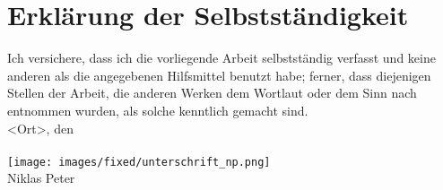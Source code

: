 


\chapter*{Erklärung der Selbstständigkeit}
%
Ich versichere, dass ich die vorliegende Arbeit selbstständig verfasst und keine anderen als die angegebenen Hilfsmittel benutzt habe; ferner, dass diejenigen Stellen der Arbeit, die anderen Werken dem Wortlaut oder dem Sinn nach entnommen wurden, als solche kenntlich gemacht sind.
%
\mbox{}\vspace{4\baselineskip}\\
%
<Ort>, den \npHandoverDate \\
\mbox{}\vspace{2\baselineskip}\\
\texttt{[image: images/fixed/unterschrift\_np.png]}\\
Niklas Peter \\


